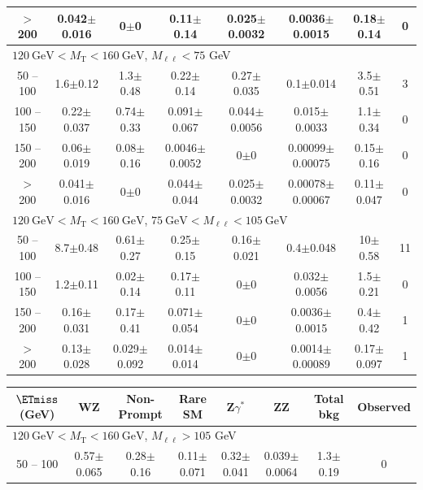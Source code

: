 \begin{landscape}
\begin{table}
\begin{center}
\begin{tabular}{| c | c c c c c c c | }
$>$ 200&0.042$\pm$0.016&0$\pm$0&0.11$\pm$0.14&0.025$\pm$0.0032&0.0036$\pm$0.0015&0.18$\pm$0.14&0\\
\hline\hline
\multicolumn{8}{l}{$120~\mathrm{GeV} < M_{\text{T}} < 160~\mathrm{GeV}$, $M_{\ell\ell} < 75$ GeV}\\\hline\hline
50 -- 100&1.6$\pm$0.12&1.3$\pm$0.48&0.22$\pm$0.14&0.27$\pm$0.035&0.1$\pm$0.014&3.5$\pm$0.51&3\\
100 -- 150&0.22$\pm$0.037&0.74$\pm$0.33&0.091$\pm$0.067&0.044$\pm$0.0056&0.015$\pm$0.0033&1.1$\pm$0.34&0\\
150 -- 200&0.06$\pm$0.019&0.08$\pm$0.16&0.0046$\pm$0.0052&0$\pm$0&0.00099$\pm$0.00075&0.15$\pm$0.16&0\\
$>$ 200&0.041$\pm$0.016&0$\pm$0&0.044$\pm$0.044&0.025$\pm$0.0032&0.00078$\pm$0.00067&0.11$\pm$0.047&0\\
\hline\hline
\multicolumn{8}{l}{$120~\mathrm{GeV} < M_{\text{T}} < 160~\mathrm{GeV}$, $75~\mathrm{GeV} < M_{\ell\ell} < 105~\mathrm{GeV}$}\\\hline\hline
50 -- 100&8.7$\pm$0.48&0.61$\pm$0.27&0.25$\pm$0.15&0.16$\pm$0.021&0.4$\pm$0.048&10$\pm$0.58&11\\
100 -- 150&1.2$\pm$0.11&0.02$\pm$0.14&0.17$\pm$0.11&0$\pm$0&0.032$\pm$0.0056&1.5$\pm$0.21&0\\
150 -- 200&0.16$\pm$0.031&0.17$\pm$0.41&0.071$\pm$0.054&0$\pm$0&0.0036$\pm$0.0015&0.4$\pm$0.42&1\\
$>$ 200&0.13$\pm$0.028&0.029$\pm$0.092&0.014$\pm$0.014&0$\pm$0&0.0014$\pm$0.00089&0.17$\pm$0.097&1\\
\hline\hline
\end{tabular}
\end{center}
\end{table}
\begin{table}
\begin{center}
\begin{tabular}{| c | c c c c c c c | }\hline\hline
$\ETmiss$ (GeV) & WZ & Non-Prompt & Rare SM & Z$\gamma^*$ & ZZ & Total bkg & Observed\\\hline\hline
\multicolumn{8}{l}{$120~\mathrm{GeV} < M_{\text{T}} < 160~\mathrm{GeV}$, $M_{\ell\ell} > 105$ GeV}\\\hline\hline
50 -- 100&0.57$\pm$0.065&0.28$\pm$0.16&0.11$\pm$0.071&0.32$\pm$0.041&0.039$\pm$0.0064&1.3$\pm$0.19&0\\

\end{tabular}
\end{center}
\end{table}
\end{landscape}
